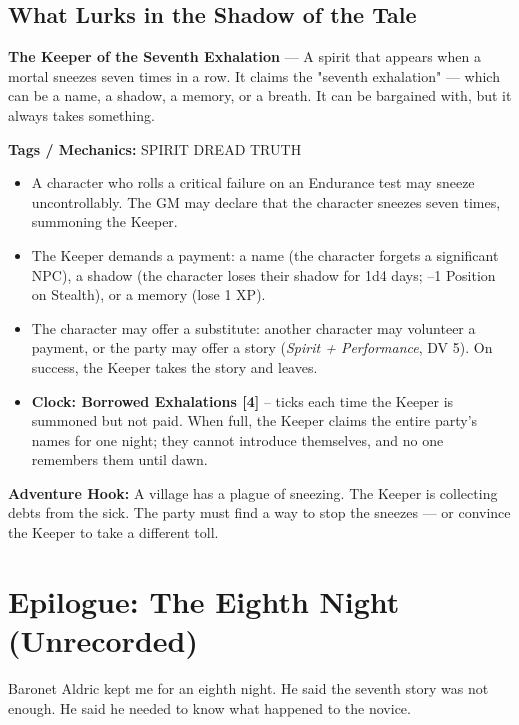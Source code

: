 \documentclass[10pt,twoside]{book}
\newcommand{\tag}[1]{\textsc{#1}}
\begin{document}
\section*{What Lurks in the Shadow of the Tale}
\begin{infobox}
\textbf{The Keeper of the Seventh Exhalation} --- A spirit that appears when a mortal sneezes seven times in a row. It claims the "seventh exhalation" --- which can be a name, a shadow, a memory, or a breath. It can be bargained with, but it always takes something.

\textbf{Tags / Mechanics:} \tag{SPIRIT} \tag{DREAD} \tag{TRUTH}

\begin{itemize}
\item A character who rolls a critical failure on an Endurance test may sneeze uncontrollably. The GM may declare that the character sneezes seven times, summoning the Keeper.
\item The Keeper demands a payment: a name (the character forgets a significant NPC), a shadow (the character loses their shadow for 1d4 days; --1 Position on Stealth), or a memory (lose 1 XP).
\item The character may offer a substitute: another character may volunteer a payment, or the party may offer a story (\textit{Spirit + Performance}, DV 5). On success, the Keeper takes the story and leaves.
\item \textbf{Clock: Borrowed Exhalations [4]} -- ticks each time the Keeper is summoned but not paid. When full, the Keeper claims the entire party's names for one night; they cannot introduce themselves, and no one remembers them until dawn.
\end{itemize}

\textbf{Adventure Hook:} A village has a plague of sneezing. The Keeper is collecting debts from the sick. The party must find a way to stop the sneezes --- or convince the Keeper to take a different toll.
\end{infobox}

\chapter*{Epilogue: The Eighth Night (Unrecorded)}

Baronet Aldric kept me for an eighth night. He said the seventh story was not enough. He said he needed to know what happened to the novice.
\end{document}

